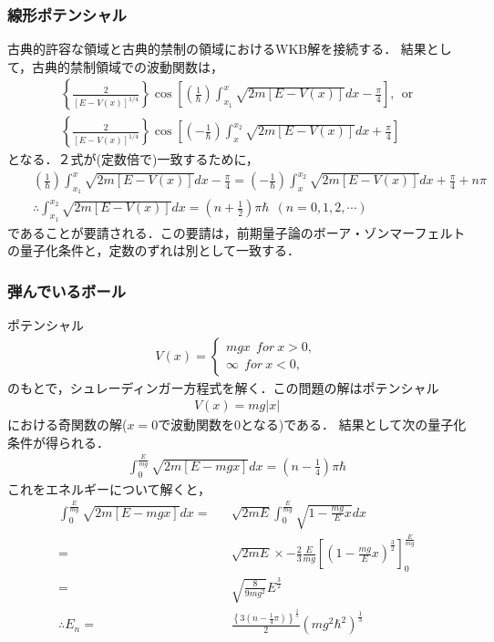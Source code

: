 \documentclass[12pt]{jsarticle}
\numberwithin{equation}{section}
\begin{document}
\subsubsection{線形ポテンシャル}
古典的許容な領域と古典的禁制の領域におけるWKB解を接続する．
結果として，古典的禁制領域での波動関数は，
\begin{eqnarray}
	\left\{\frac{2}{[E-V(x)]^{1/4}}\right\}\cos \left[\left(\frac{1}{\hbar}\right) \int_{x_1}^{x} \sqrt{2m \left[E-V(x)\right]} dx - \frac{\pi}{4} \right], ~~ \mathrm {or} \nonumber\\
	\left\{\frac{2}{[E-V(x)]^{1/4}}\right\}\cos \left[\left(-\frac{1}{\hbar}\right) \int_{x}^{x_2} \sqrt{2m \left[E-V(x)\right]} dx + \frac{\pi}{4} \right] \nonumber
\end{eqnarray}
となる．２式が(定数倍で)一致するために，
\begin{eqnarray}
	&&\left(\frac{1}{\hbar}\right) \int_{x_1}^{x} \sqrt{2m \left[E-V(x)\right]} dx - \frac{\pi}{4} = \left(-\frac{1}{\hbar}\right) \int_{x}^{x_2} \sqrt{2m \left[E-V(x)\right]} dx + \frac{\pi}{4} +n\pi \nonumber\\
	&& \therefore \int_{x_1}^{x_2} \sqrt{2m \left[E-V(x)\right]} dx = \left(n+\frac{1}{2}\right) \pi\hbar ~~ (n=0,1,2,\cdots)
\end{eqnarray}
であることが要請される．この要請は，前期量子論のボーア・ゾンマーフェルトの量子化条件と，定数のずれは別として一致する．

\subsubsection{弾んでいるボール}
ポテンシャル
\begin{eqnarray}
	V(x) = 
	\begin{cases}
		mgx ~~ for ~ x>0,\nonumber\\
		\infty ~~ for ~ x<0,\nonumber
	\end{cases}
\end{eqnarray}
のもとで，シュレーディンガー方程式を解く．この問題の解はポテンシャル
\begin{eqnarray}
	V(x) = mg|x|
\end{eqnarray}
における奇関数の解($x=0$で波動関数を0となる)である．
結果として次の量子化条件が得られる．
\begin{eqnarray}
	\int_{0}^{\frac{E}{mg}} \sqrt{2m \left[E-mgx\right]} dx = \left(n-\frac{1}{4}\right)\pi\hbar
\end{eqnarray}
これをエネルギーについて解くと，
\begin{eqnarray}
	\int_{0}^{\frac{E}{mg}} \sqrt{2m \left[E-mgx\right]} dx =&& \sqrt{2mE} \int_{0}^{\frac{E}{mg}} \sqrt{1-\frac{mg}{E}x} dx \nonumber\\
	=&& \sqrt{2mE} \times -\frac{2}{3} \frac{E}{mg} \left[\left(1-\frac{mg}{E}x\right)^\frac{3}{2}\right]_0^\frac{E}{mg} \nonumber\\
	=&& \sqrt{\frac{8}{9mg^2}} E^{\frac{3}{2}} \nonumber\\
	\therefore E_n =&& \frac{\left\{3(n-\frac{1}{4}\pi)\right\}^\frac{2}{3}}{2} (mg^2\hbar^2)^\frac{1}{3}
\end{eqnarray}
\end{document}
